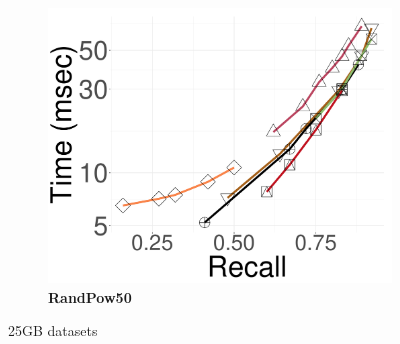 \begin{figure}[!htb]
\begin{minipage}{\textwidth}
   \hspace{0.4cm}
	\begin{subfigure}{\soneM\textwidth}
 \centering
		\includegraphics[width=\textwidth]{../img/Experiments/search/25/pow50_10nn.pdf}
		\caption{\textbf{RandPow50}} 
		\label{fig:query:performance:25GB:rand:pow50:10NN}
	\end{subfigure}		
		\caption{{25GB datasets}}
		\label{fig:elpis:query:performance:25GB}
	\end{minipage}
\end{figure}

